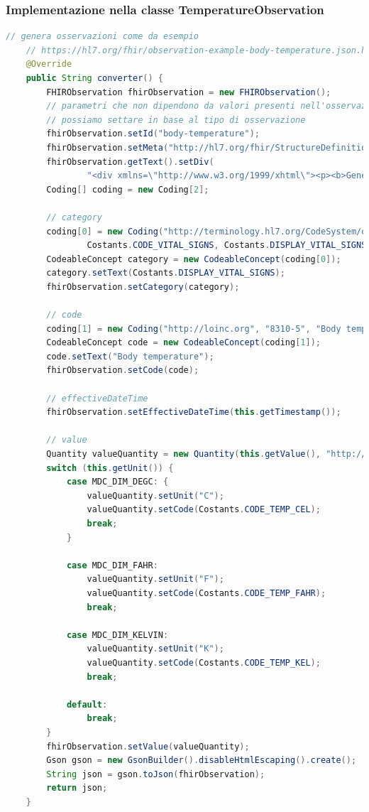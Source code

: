 \documentclass[a4paper]{article}
\begin{document}
\subsubsection*{Implementazione nella classe TemperatureObservation}
\begin{lstlisting}[language= Java, caption = Metodo converter per la classe TemperatureObservation]
    // genera osservazioni come da esempio
    // https://hl7.org/fhir/observation-example-body-temperature.json.html
    @Override
    public String converter() {
        FHIRObservation fhirObservation = new FHIRObservation();
        // parametri che non dipendono da valori presenti nell'osservazione ACOM, ma che
        // possiamo settare in base al tipo di osservazione
        fhirObservation.setId("body-temperature");
        fhirObservation.setMeta("http://hl7.org/fhir/StructureDefinition/vitalsigns");
        fhirObservation.getText().setDiv(
                "<div xmlns=\"http://www.w3.org/1999/xhtml\"><p><b>Generated Narrative: Observation</b><a name=\"body-temperature\">");
        Coding[] coding = new Coding[2];

        // category
        coding[0] = new Coding("http://terminology.hl7.org/CodeSystem/observation-category",
                Costants.CODE_VITAL_SIGNS, Costants.DISPLAY_VITAL_SIGNS);
        CodeableConcept category = new CodeableConcept(coding[0]);
        category.setText(Costants.DISPLAY_VITAL_SIGNS);
        fhirObservation.setCategory(category);

        // code
        coding[1] = new Coding("http://loinc.org", "8310-5", "Body temperature");
        CodeableConcept code = new CodeableConcept(coding[1]);
        code.setText("Body temperature");
        fhirObservation.setCode(code);

        // effectiveDateTime
        fhirObservation.setEffectiveDateTime(this.getTimestamp());

        // value
        Quantity valueQuantity = new Quantity(this.getValue(), "http://unitsofmeasure.org");
        switch (this.getUnit()) {
            case MDC_DIM_DEGC: {
                valueQuantity.setUnit("C");
                valueQuantity.setCode(Costants.CODE_TEMP_CEL);
                break;
            }

            case MDC_DIM_FAHR:
                valueQuantity.setUnit("F");
                valueQuantity.setCode(Costants.CODE_TEMP_FAHR);
                break;

            case MDC_DIM_KELVIN:
                valueQuantity.setUnit("K");
                valueQuantity.setCode(Costants.CODE_TEMP_KEL);
                break;

            default:
                break;
        }
        fhirObservation.setValue(valueQuantity);
        Gson gson = new GsonBuilder().disableHtmlEscaping().create();
        String json = gson.toJson(fhirObservation);
        return json;
    }
\end{lstlisting}
\end{document}
